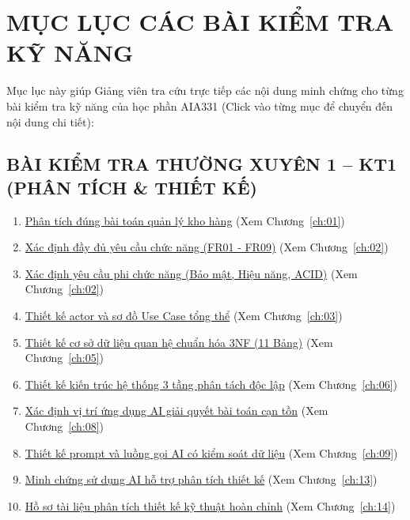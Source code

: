 \documentclass[12pt,a4paper,oneside]{report}
\begin{document}
\newpage

\tableofcontents
\newpage

\chapter*{MỤC LỤC CÁC BÀI KIỂM TRA KỸ NĂNG}

Mục lục này giúp Giảng viên tra cứu trực tiếp các nội dung minh chứng cho từng bài kiểm tra kỹ năng của học phần AIA331 (Click vào từng mục để chuyển đến nội dung chi tiết):

\section*{\hypertarget{sec:kt1_toc}{BÀI KIỂM TRA THƯỜNG XUYÊN 1 – KT1 (PHÂN TÍCH \& THIẾT KẾ)}}
\begin{enumerate}
    \item \hyperlink{ch:01}{Phân tích đúng bài toán quản lý kho hàng} (Xem Chương~\ref{ch:01})
    \item \hyperlink{ch:02}{Xác định đầy đủ yêu cầu chức năng (FR01 - FR09)} (Xem Chương~\ref{ch:02})
    \item \hyperlink{ch:02}{Xác định yêu cầu phi chức năng (Bảo mật, Hiệu năng, ACID)} (Xem Chương~\ref{ch:02})
    \item \hyperlink{ch:03}{Thiết kế actor và sơ đồ Use Case tổng thể} (Xem Chương~\ref{ch:03})
    \item \hyperlink{ch:05}{Thiết kế cơ sở dữ liệu quan hệ chuẩn hóa 3NF (11 Bảng)} (Xem Chương~\ref{ch:05})
    \item \hyperlink{ch:06}{Thiết kế kiến trúc hệ thống 3 tầng phân tách độc lập} (Xem Chương~\ref{ch:06})
    \item \hyperlink{ch:08}{Xác định vị trí ứng dụng AI giải quyết bài toán cạn tồn} (Xem Chương~\ref{ch:08})
    \item \hyperlink{ch:09}{Thiết kế prompt và luồng gọi AI có kiểm soát dữ liệu} (Xem Chương~\ref{ch:09})
    \item \hyperlink{ch:13}{Minh chứng sử dụng AI hỗ trợ phân tích thiết kế} (Xem Chương~\ref{ch:13})
    \item \hyperlink{ch:14}{Hồ sơ tài liệu phân tích thiết kế kỹ thuật hoàn chỉnh} (Xem Chương~\ref{ch:14})
\end{enumerate}
\end{document}
